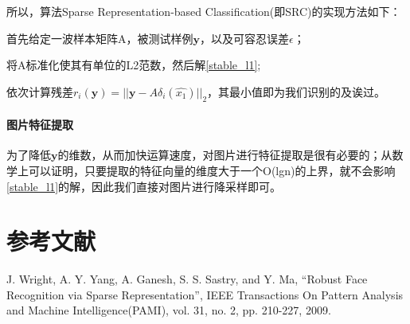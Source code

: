 \documentclass[a4paper,12pt]{article}
\begin{document}
所以，算法Sparse Representation-based Classification(即SRC)的实现方法如下：

首先给定一波样本矩阵A，被测试样例$\boldsymbol{y}$，以及可容忍误差$\epsilon$；

将A标准化使其有单位的L2范数，然后解\eqref{stable_l1};

依次计算残差$r_{i}(\boldsymbol{y}) = ||\boldsymbol{y}-A\delta_{i}(\hat{x_{1}})||_{2}$，其最小值即为我们识别的及诶过。

\paragraph{图片特征提取}
为了降低$\boldsymbol{y}$的维数，从而加快运算速度，对图片进行特征提取是很有必要的；从数学上可以证明，只要提取的特征向量的维度大于一个O(lgn)的上界，就不会影响\eqref{stable_l1}的解，因此我们直接对图片进行降采样即可。


\section{参考文献}
J. Wright, A. Y. Yang, A. Ganesh, S. S. Sastry, and Y. Ma, “Robust Face Recognition via Sparse Representation”, IEEE Transactions On Pattern Analysis and Machine Intelligence(PAMI), vol. 31, no. 2, pp. 210-227, 2009.

\label{LastPage}
\end{document}
